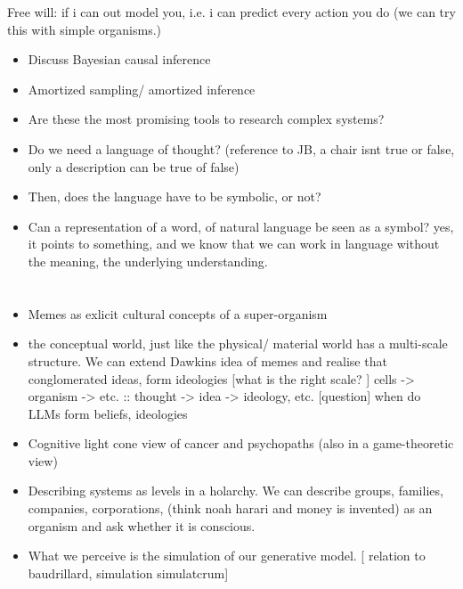 







Free will: if i can out model you, i.e. i can predict every action you do (we can try this with simple organisms.)






























\begin{itemize}
    \item Discuss Bayesian causal inference
    \item Amortized sampling/ amortized inference
    \item Are these the most promising tools to research complex systems?
    \item Do we need a language of thought? (reference to JB, a chair isnt true or false, only a description can be true of false)
    \item Then, does the language have to be symbolic, or not? 
    \item Can a representation of a word, of natural language be seen as a symbol? yes, it points to something, and we know that we can work in language without the meaning, the underlying understanding. 
\end{itemize}


\section{}
\begin{itemize}
    \item Memes as exlicit cultural concepts of a super-organism
    \item the conceptual world, just like the physical/ material world has a multi-scale structure. We can extend Dawkins idea of memes and realise that conglomerated ideas, form ideologies [what is the right scale? ] cells -> organism -> etc. :: thought -> idea -> ideology, etc. [question] when do LLMs form beliefs, ideologies
    \item Cognitive light cone view of cancer and psychopaths (also in a game-theoretic view)
    \item Describing systems as levels in a holarchy. We can describe groups, families, companies, corporations, (think noah harari and money is invented) as an organism and ask whether it is conscious. 
    \item What we perceive is the simulation of our generative model. [ relation to baudrillard, simulation simulatcrum]
\end{itemize}


